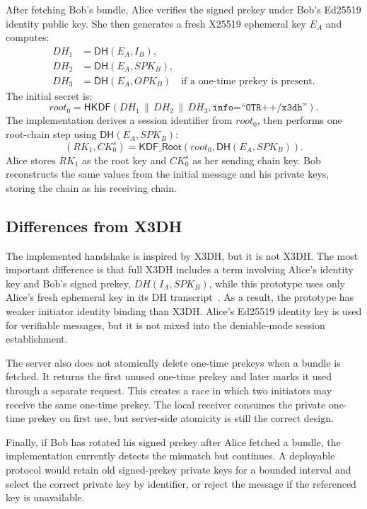 \documentclass[11pt]{article}
\newcommand{\HKDF}{\mathsf{HKDF}}
\newcommand{\DH}{\mathsf{DH}}
\begin{document}
After fetching Bob's bundle, Alice verifies the signed prekey under Bob's Ed25519 identity public key. She then generates a fresh X25519 ephemeral key $E_A$ and computes:
\begin{align*}
  DH_1 &= \DH(E_A, I_B),\\
  DH_2 &= \DH(E_A, SPK_B),\\
  DH_3 &= \DH(E_A, OPK_B) \quad \text{if a one-time prekey is present.}
\end{align*}
The initial secret is:
\[
  root_0 = \HKDF(DH_1 \,\|\, DH_2 \,\|\, DH_3,
  \texttt{info=``OTR++/x3dh''}).
\]
The implementation derives a session identifier from $root_0$, then performs one root-chain step using $\DH(E_A, SPK_B)$:
\[
  (RK_1, CK^s_0) = \mathsf{KDF\_Root}(root_0, \DH(E_A, SPK_B)).
\]
Alice stores $RK_1$ as the root key and $CK^s_0$ as her sending chain key. Bob reconstructs the same values from the initial message and his private keys, storing the chain as his receiving chain.

\subsection{Differences from X3DH}

The implemented handshake is inspired by X3DH, but it is not X3DH. The most important difference is that full X3DH includes a term involving Alice's identity key and Bob's signed prekey, $DH(I_A, SPK_B)$, while this prototype uses only Alice's fresh ephemeral key in its DH transcript~\cite{signal_x3dh}. As a result, the prototype has weaker initiator identity binding than X3DH. Alice's Ed25519 identity key is used for verifiable messages, but it is not mixed into the deniable-mode session establishment.

The server also does not atomically delete one-time prekeys when a bundle is fetched. It returns the first unused one-time prekey and later marks it used through a separate request. This creates a race in which two initiators may receive the same one-time prekey. The local receiver consumes the private one-time prekey on first use, but server-side atomicity is still the correct design.

Finally, if Bob has rotated his signed prekey after Alice fetched a bundle, the implementation currently detects the mismatch but continues. A deployable protocol would retain old signed-prekey private keys for a bounded interval and select the correct private key by identifier, or reject the message if the referenced key is unavailable.
\end{document}
